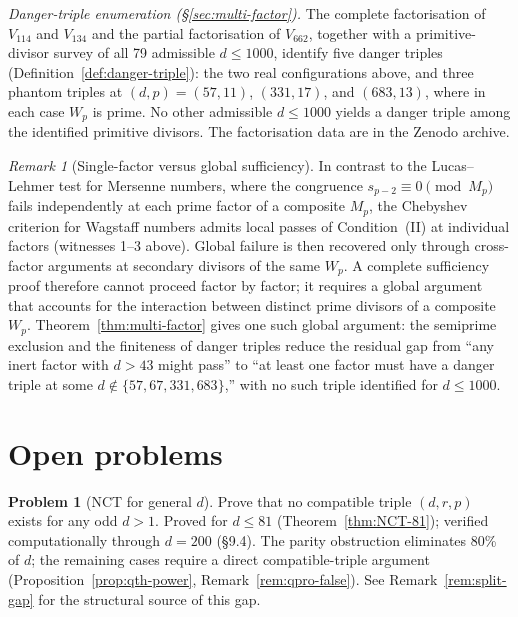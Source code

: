 \documentclass[12pt]{article}
\theoremstyle{plain}
\theoremstyle{definition}
\theoremstyle{remark}
\newtheorem{remark}[theorem]{Remark}
\begin{document}
\emph{Danger-triple enumeration (\S\ref{sec:multi-factor}).} The complete factorisation
of \(V_{114}\) and \(V_{134}\) and the partial factorisation of
\(V_{662}\), together with a primitive-divisor survey of all 79
admissible \(d \leq 1000\), identify five danger triples
(Definition~\ref{def:danger-triple}): the two real configurations
above, and three phantom triples at \((d, p) = (57, 11)\),
\((331, 17)\), and \((683, 13)\), where in each case \(W_p\) is
prime. No other admissible \(d \leq 1000\) yields a danger triple
among the identified primitive divisors.
The factorisation data are in the Zenodo archive.

\begin{remark}[Single-factor versus global sufficiency]\label{rem:single-vs-global}
In contrast to the Lucas--Lehmer test for Mersenne numbers, where the
congruence \(s_{p-2} \equiv 0 \pmod{M_p}\) fails independently at
each prime factor of a composite \(M_p\), the Chebyshev criterion
for Wagstaff numbers admits local passes of Condition~(II) at
individual factors (witnesses 1--3 above). Global failure is then
recovered only through cross-factor arguments at secondary
divisors of the same \(W_p\). A complete sufficiency proof
therefore cannot proceed factor by factor; it requires a global
argument that accounts for the interaction between distinct prime
divisors of a composite \(W_p\).
Theorem~\ref{thm:multi-factor} gives one such global argument: the
semiprime exclusion and the finiteness of danger triples reduce the
residual gap from ``any inert factor with \(d > 43\) might pass'' to
``at least one factor must have a danger triple at some
\(d \notin \{57, 67, 331, 683\}\),'' with no such triple identified
for \(d \leq 1000\).
\end{remark}



\section{Open problems}

\textbf{Problem 1} (NCT for general \(d\)). Prove that no compatible triple
\((d, r, p)\) exists for any odd \(d > 1\). Proved for \(d \leq 81\)
(Theorem~\ref{thm:NCT-81}); verified computationally through \(d = 200\) (\S9.4).
The parity obstruction eliminates 80\% of \(d\); the remaining
cases require a direct compatible-triple argument (Proposition~\ref{prop:qth-power},
Remark~\ref{rem:qpro-false}). See Remark~\ref{rem:split-gap} for the structural source of this gap.
\end{document}
